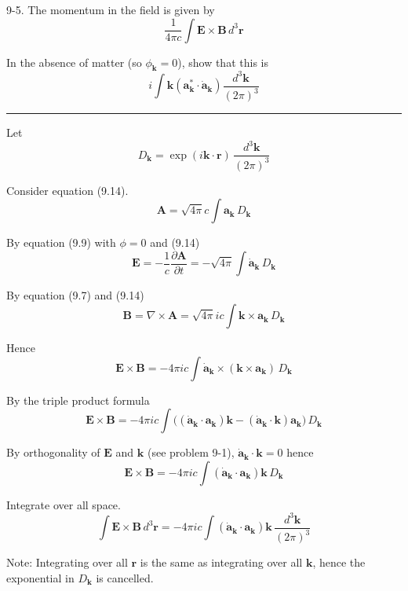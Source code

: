 \documentclass[12pt]{article}
\begin{document}
9-5.
The momentum in the field is given by
\begin{equation*}
\frac{1}{4\pi c}\int
\mathbf E\times\mathbf B\,d^3\mathbf r
\end{equation*}

In the absence of matter (so $\phi_{\mathbf k}=0$),
show that this is
\begin{equation*}
i\int\mathbf k\left(\mathbf a_{\mathbf k}^*\cdot\dot{\mathbf a}_{\mathbf k}\right)
\frac{d^3\mathbf k}{(2\pi)^3}
\end{equation*}

\bigskip
\hrule

\bigskip
Let
\begin{equation*}
D_{\mathbf k}=\exp(i\mathbf k\cdot\mathbf r)\,\frac{d^3\mathbf k}{(2\pi)^3}
\end{equation*}

Consider equation (9.14).
\begin{equation*}
\mathbf A=\sqrt{4\pi}c\int\mathbf a_{\mathbf k}\,D_{\mathbf k}
\tag{9.14}
\end{equation*}

By equation (9.9) with $\phi=0$ and (9.14)
\begin{equation*}
\mathbf E=-\frac{1}{c}\frac{\partial\mathbf A}{\partial t}
=-\sqrt{4\pi}\int\dot{\mathbf a}_{\mathbf k}\,D_{\mathbf k}
\end{equation*}

By equation (9.7) and (9.14)
\begin{equation*}
\mathbf B=\nabla\times\mathbf A
=\sqrt{4\pi}ic\int\mathbf k\times\mathbf a_{\mathbf k}\,D_{\mathbf k}
\end{equation*}

Hence
\begin{equation*}
\mathbf E\times\mathbf B=-4\pi ic\int
\dot{\mathbf a}_{\mathbf k}
\times\left(\mathbf k\times\mathbf a_{\mathbf k}\right)\,D_{\mathbf k}
\end{equation*}

By the triple product formula
\begin{equation*}
\mathbf E\times\mathbf B=-4\pi ic\int
\big(
(\dot{\mathbf a}_{\mathbf k}\cdot\mathbf a_{\mathbf k})\mathbf k
-(\dot{\mathbf a}_{\mathbf k}\cdot\mathbf k)\mathbf a_{\mathbf k}
\big)\,D_{\mathbf k}
\end{equation*}

By orthogonality of $\mathbf E$ and $\mathbf k$ (see problem 9-1),
$\dot{\mathbf a}_{\mathbf k}\cdot\mathbf k=0$ hence
\begin{equation*}
\mathbf E\times\mathbf B
=-4\pi ic\int(\dot{\mathbf a}_{\mathbf k}\cdot\mathbf a_{\mathbf k})\mathbf k
\,D_{\mathbf k}
\end{equation*}

Integrate over all space.
\begin{equation*}
\int\mathbf E\times\mathbf B
\,d^3\mathbf r
=-4\pi ic\int(\dot{\mathbf a}_{\mathbf k}\cdot\mathbf a_{\mathbf k})\mathbf k
\,\frac{d^3\mathbf k}{(2\pi)^3}
\end{equation*}

Note: Integrating over all $\mathbf r$ is the same as integrating over all $\mathbf k$,
hence the exponential in $D_{\mathbf k}$ is cancelled.
\end{document}
